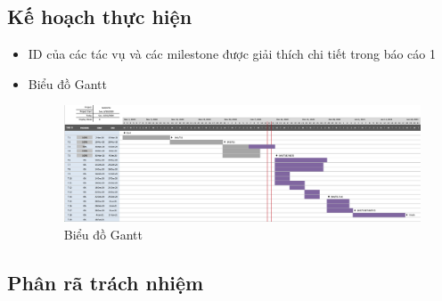 \documentclass[a4paper, 12pt]{article}
\begin{document}
\clearpage 

\subsection{Kế hoạch thực hiện}

\begin{itemize}
	\item ID của các tác vụ và các milestone được giải thích chi tiết trong báo cáo 1
	\item Biểu đồ Gantt 
	\begin{figure}[H]
		\begin{center}
			\includegraphics[scale=0.45, angle=90]{./image/gantt.png}
			\caption{Biểu đồ Gantt}
		\end{center}
	\end{figure}
\end{itemize}

\subsection{Phân rã trách nhiệm}
\end{document}
